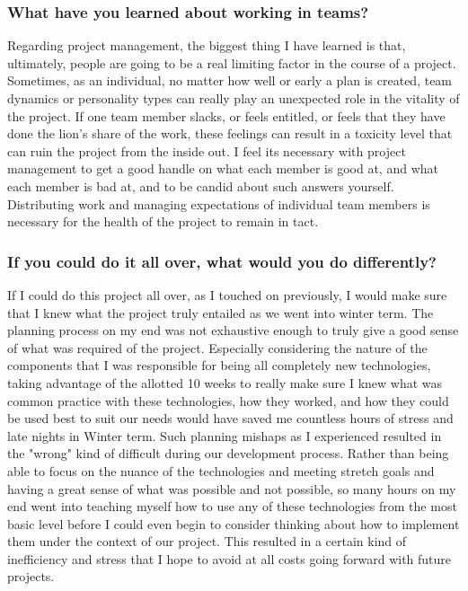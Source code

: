 \documentclass[onecolumn, draftclsnofoot,10pt, compsoc]{IEEEtran}
\begin{document}
\subsubsection{What have you learned about working in teams?}
Regarding project management, the biggest thing I have learned is that, ultimately, people are going to be a real limiting factor in the course of a project. Sometimes, as an individual, no matter how well or early a plan is created, team dynamics or personality types can really play an unexpected role in the vitality of the project. If one team member slacks, or feels entitled, or feels that they have done the lion's share of the work, these feelings can result in a toxicity level that can ruin the project from the inside out. I feel its necessary with project management to get a good handle on what each member is good at, and what each member is bad at, and to be candid about such answers yourself. Distributing work and managing expectations of individual team members is necessary for the health of the project to remain in tact.
\subsubsection{If you could do it all over, what would you do differently?}
If I could do this project all over, as I touched on previously, I would make sure that I knew what the project truly entailed as we went into winter term. The planning process on my end was not exhaustive enough to truly give a good sense of what was required of the project. Especially considering the nature of the components that I was responsible for being all completely new technologies, taking advantage of the allotted 10 weeks to really make sure I knew what was common practice with these technologies, how they worked, and how they could be used best to suit our needs would have saved me countless hours of stress and late nights in Winter term. Such planning mishaps as I experienced resulted in the "wrong" kind of difficult during our development process. Rather than being able to focus on the nuance of the technologies and meeting stretch goals and having a great sense of what was possible and not possible, so many hours on my end went into teaching myself how to use any of these technologies from the most basic level before I could even begin to consider thinking about how to implement them under the context of our project. This resulted in a certain kind of inefficiency and stress that I hope to avoid at all costs going forward with future projects.
\end{document}
